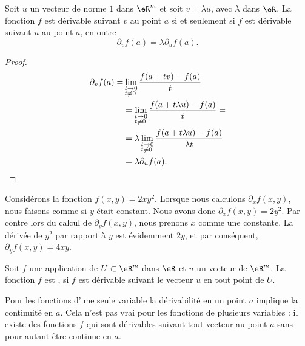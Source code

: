 \begin{proposition}
Soit $u$ un vecteur de norme $1$ dans $\eR^m$ et soit $v=\lambda u$, avec $\lambda$ dans $\eR$. La fonction $f$ est dérivable suivant $v$ au point $a$ si et seulement si $f$ est dérivable suivant $u$ au point $a$, en outre
\[
\partial_v f(a)=\lambda\partial_u f(a).
\]
\end{proposition}
\begin{proof}
  \begin{equation}
    \begin{aligned}
  \partial_v f(a)=&\lim_{\begin{subarray}{l}
     t\to 0\\ t\neq 0
    \end{subarray}}\frac{f(a+tv)-f(a)}{t}\\
    &=\lim_{\begin{subarray}{l}
     t\to 0\\ t\neq 0
    \end{subarray}}\frac{f(a+t\lambda u)-f(a)}{t}=\\
&=\lambda \lim_{\begin{subarray}{l}
    t\to 0\\ t\neq 0
  \end{subarray}}\frac{f(a+t\lambda u)-f(a)}{\lambda t}\\
  &=\lambda \partial_u f(a).
    \end{aligned}
  \end{equation}
\end{proof}

\begin{example}
	Considérons la fonction $f(x,y)=2xy^2$. Lorsque nous calculons $\partial_xf(x,y)$, nous faisons comme si $y$ était constant. Nous avons donc $\partial_xf(x,y)=2y^2$. Par contre lors du calcul de $\partial_yf(x,y)$, nous prenons $x$ comme une constante. La dérivée de $y^2$ par rapport à $y$ est évidemment $2y$, et par conséquent, $\partial_yf(x,y)=4xy$.
\end{example}

\begin{definition}
  Soit $f$ une application de $U\subset\eR^m$ dans $\eR$ et $u$ un vecteur de $\eR^m$. La fonction $f$ est , si $f$ est dérivable  suivant le vecteur $u$ en tout point de $U$.
\end{definition}

Pour les fonctions d'une seule variable la dérivabilité en un point $a$ implique la continuité en $a$. Cela n'est pas vrai pour les fonctions de plusieurs variables : il existe des fonctions $f$  qui sont dérivables suivant tout vecteur au point $a$ sans pour autant être continue en $a$.

